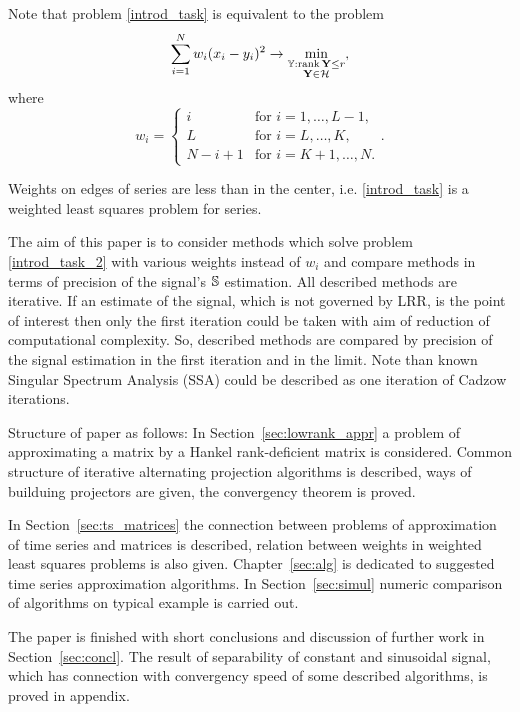 \documentclass[12pt,a4paper,fleqn,leqno]{article}
\def\rank{\mathop{\mathrm{rank}}}
\begin{document}
Note that problem \eqref{introd_task} is equivalent to the problem
\begin{equation}\label{introd_task_2}
\sum_{i = 1}^N w_i(x_i - y_i)^2 \to \min_{\substack{\tsY: \rank \bfY \le r \\ \bfY \in \calH}},
\end{equation}
where
\begin{equation}
\label{eq:w}
w_i = \begin{cases}
i & \text{for $i = 1, \ldots, L-1,$}\\
L & \text{for $i = L, \ldots, K,$}\\
N - i + 1 & \text{for $i = K + 1, \ldots, N.$}
\end{cases}.
\end{equation}

Weights on edges of series are less than in the center, i.e. \eqref{introd_task} is a weighted least squares problem for series.

The aim of this paper is to consider methods which solve problem \eqref{introd_task_2} with various weights instead of $w_i$ and compare methods in terms of precision of the signal's $\mathbb{S}$ estimation. All described methods are iterative. If an estimate of the signal, which is not governed by LRR, is the point of interest then only the first iteration could be taken with aim of reduction of computational complexity. So, described methods are compared by precision of the signal estimation in the first iteration and in the limit. Note than known Singular Spectrum Analysis (SSA) \cite{Broomhead.King1986, Vautard.etal1992, Elsner.Tsonis1996, Golyandina.etal2001, Ghil.etal2002, Golyandina.Zhigljavsky2012} could be
described as one iteration of Cadzow iterations.

Structure of paper as follows:  In Section~\ref{sec:lowrank_appr} a problem of approximating a matrix by a Hankel rank-deficient matrix is considered. Common structure of iterative alternating projection algorithms is described, ways of builduing projectors are given, the convergency theorem is proved.

In Section~\ref{sec:ts_matrices} the connection between problems of approximation of time series and matrices is described, relation between weights in weighted least squares problems is also given. Chapter~\ref{sec:alg} is dedicated to suggested time series approximation algorithms. In Section~\ref{sec:simul} numeric comparison of algorithms on typical example is carried out.

The paper is finished with short conclusions and discussion of further work in Section~\ref{sec:concl}. The result of separability of constant and sinusoidal signal, which has connection with convergency speed of some described algorithms, is proved in appendix.
\end{document}
